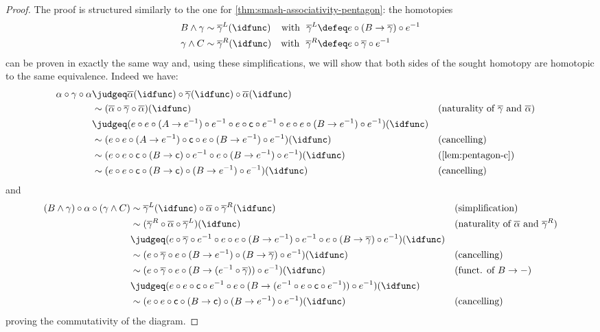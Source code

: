 \documentclass{article}
\newcommand{\smsh}{\wedge}
\renewcommand{\o}{\ensuremath{\circ}}
\newcommand{\sy}{^{-1}}
\newcommand{\alphabar}{\overline{\alpha}}
\newcommand{\gammabar}{\overline{\gamma}}
\newcommand{\twist}{\mathsf{c}}
\begin{document}
\begin{proof}
	The proof is structured similarly to the one for \autoref{thm:smash-associativity-pentagon}: the homotopies
	\begin{align*}
	B \smsh \gamma &\sim \gammabar^L(\idfunc) &\text{with\ \ } \gammabar^L &\defeq e \o (B \to \gammabar) \o e\sy\\
	\gamma \smsh C &\sim \gammabar^R(\idfunc) &\text{with\ \ } \gammabar^R &\defeq e \o \gammabar \o e\sy
	\end{align*}		
	can be proven in exactly the same way and, using these simplifications, we will show that both sides of the sought homotopy are homotopic to the same equivalence. Indeed we have:
	\begin{align*}
		\alpha \o \gamma \o \alpha
		&\judgeq \alphabar(\idfunc) \o \gammabar(\idfunc) \o \alphabar(\idfunc)\\
		&\sim (\alphabar \o \gammabar \o \alphabar)(\idfunc) &&\text{(naturality of $\gammabar$ and $\alphabar$)}\\
		&\judgeq (e \o e \o (A \to e\sy) \o e\sy \o e \o \twist \o e\sy \o e \o e \o (B \to e\sy) \o e\sy)(\idfunc)\\
		&\sim (e \o e \o (A \to e\sy) \o \twist \o e \o (B \to e\sy) \o e\sy)(\idfunc) &&\text{(cancelling)}\\
		&\sim (e \o e \o \twist \o (B \to \twist) \o e\sy \o e \o (B \to e\sy) \o e\sy)(\idfunc) &&\text{(\autoref{lem:pentagon-c})}\\
		&\sim (e \o e \o \twist \o (B \to \twist) \o (B \to e\sy) \o e\sy)(\idfunc) &&\text{(cancelling)}
	\end{align*}
	and
	\begin{align*}
		(B \smsh \gamma) \o \alpha \o (\gamma \smsh C)
		&\sim \gammabar^L(\idfunc) \o \alphabar \o \gammabar^R(\idfunc) &&\text{(simplification)}\\
		&\sim (\gammabar^R \o \alphabar \o \gammabar^L)(\idfunc) &&\text{(naturality of $\alphabar$ and $\gammabar^R$)}\\
		&\judgeq (e \o \gammabar \o e\sy \o e \o e \o (B \to e\sy) \o e\sy \o e \o (B \to \gammabar) \o e\sy)(\idfunc)\\
		&\sim (e \o \gammabar \o e \o (B \to e\sy) \o (B \to \gammabar) \o e\sy)(\idfunc) &&\text{(cancelling)}\\
		&\sim (e \o \gammabar \o e \o (B \to (e\sy \o \gammabar)) \o e\sy)(\idfunc) &&\text{(funct. of $B \to -$)}\\
		&\judgeq (e \o e \o \twist \o e\sy \o e \o (B \to (e\sy \o e \o \twist \o e\sy)) \o e\sy)(\idfunc)\\
		&\sim (e \o e \o \twist \o (B \to \twist) \o (B \to e\sy) \o e\sy)(\idfunc) &&\text{(cancelling)}
	\end{align*}
	proving the commutativity of the diagram.
\end{proof}
\end{document}
